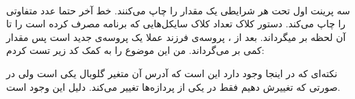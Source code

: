 \\
سه پرینت اول تحت هر شرایطی یک مقدار را چاپ می‌کنند.
خط آخر حتما عدد متفاوتی را چاپ می‌کند. دستور کلاک تعداد کلاک سایکل‌هایی که برنامه مصرف کرده‌ است را تا آن لحظه
بر میگرداند. بعد از
،
پروسه‌ی فرزند عملا یک پروسه‌ی جدید است پس
مقدار کمی بر می‌گرداند. من این موضوع را به کمک کد زیر تست کردم:

نکته‌ای که در اینجا وجود دارد این است که آدرس آن متغیر گلوبال یکی است ولی در صورتی که تغییرش دهیم فقط در یکی
از پردازه‌ها تغییر می‌کند. دلیل این وجود
است.





